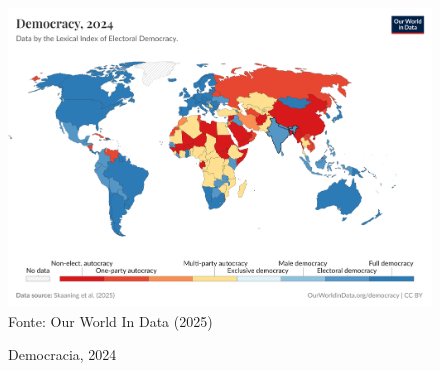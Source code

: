 \begin{figure}[htbp]
    \centering
    \caption{Democracia, 2024}
    \includegraphics[width=1\linewidth]{figuras/democracia/political-regime-lexical.png}
    \label{fig:political-regime-lexical}
    \footnotesize{Fonte: Our World In Data (2025)}
\end{figure}
